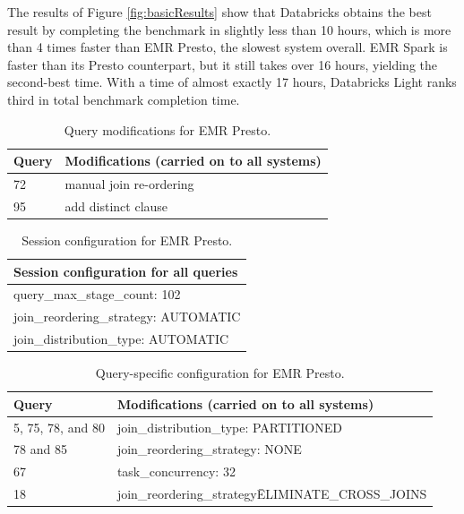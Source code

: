 The results of Figure \ref{fig:basicResults} show that Databricks obtains the best result by completing the benchmark in slightly less than 10 hours, which is more than 4 times faster than EMR Presto, the slowest system overall. EMR Spark is faster than its Presto counterpart, but it still takes over 16 hours, yielding the second-best time. With a time of almost exactly 17 hours, Databricks Light ranks third in total benchmark completion time.

\begin{table}
  \centering
	\begin{tabular}{|l|l|}
	  \hline
		\textbf{Query} & \textbf{Modifications (carried on to all systems)} \\ \hline
		72 & manual join re-ordering  \\ \hline
		95 & add distinct clause \\ \hline
	\end{tabular}
	\caption{Query modifications for EMR Presto.}
	\label{table:prestoModifiedQueries}
\end{table}

\begin{table}
  \centering
	\begin{tabular}{|l|}
	  \hline
		\textbf{Session configuration for all queries} \\ \hline
		query\_max\_stage\_count: 102  \\ \hline
		join\_reordering\_strategy: AUTOMATIC \\ \hline
		join\_distribution\_type: AUTOMATIC \\ \hline
	\end{tabular}
	\caption{Session configuration for EMR Presto.}
	\label{table:prestoSessionConf}
\end{table}

\begin{table}
  \centering
	\begin{tabular}{|l|l|}
	  \hline
		\textbf{Query} & \textbf{Modifications (carried on to all systems)} \\ \hline
		5, 75, 78, and 80 & join\_distribution\_type: PARTITIONED \\ \hline
		78 and 85 & join\_reordering\_strategy: NONE \\ \hline
		67 & task\_concurrency: 32 \\ \hline
		18 & join\_reordering\_strategy\=ELIMINATE\_CROSS\_JOINS \\ \hline
	\end{tabular}
	\caption{Query-specific configuration for EMR Presto.}
	\label{table:prestoQuerySpecificConf}
\end{table}

